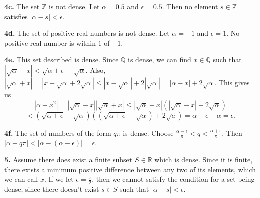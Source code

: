 \documentclass{article}
\begin{document}
\textbf{4c.} The set $\mathbb{Z}$ is not dense. Let $\alpha = 0.5$ and $\epsilon = 0.5$. Then no element $s \in \mathbb{Z}$ satisfies $|\alpha - s| < \epsilon$.
\newline

\textbf{4d.} The set of positive real numbers is not dense. Let $\alpha = -1$ and $\epsilon = 1$. No positive real number is within $1$ of $-1$.
\newline

\textbf{4e.} This set described is dense. Since $\mathbb{Q}$ is dense, we can find $x \in \mathbb{Q}$ such that $|\sqrt{\alpha} - x| < \sqrt{\alpha + \epsilon} - \sqrt{\alpha}$. Also, $|\sqrt{\alpha} + x| = |x - \sqrt{\alpha} + 2\sqrt{\alpha}| \le |x - \sqrt{\alpha}| + 2|\sqrt{\alpha}| = |\alpha - x| + 2\sqrt{\alpha}$. This gives us $$|\alpha - x^2| = |\sqrt{\alpha} - x||\sqrt{\alpha} + x| \le |\sqrt{\alpha} - x|(|\sqrt{\alpha} - x| + 2\sqrt{\alpha})$$$$ < (\sqrt{\alpha + \epsilon} - \sqrt{\alpha})((\sqrt{\alpha + \epsilon} - \sqrt{\alpha}) + 2\sqrt{a}) = \alpha + \epsilon - \alpha = \epsilon.$$
\newline

\textbf{4f.} The set of numbers of the form $q\pi$ is dense. Choose $\frac{\alpha - \epsilon}{\pi} < q < \frac{\alpha + \epsilon}{\pi}$. Then $|\alpha - q\pi| < |\alpha - (\alpha - \epsilon)| = \epsilon$.
\newline

\textbf{5.} Assume there does exist a finite subset $S \in \mathbb{R}$ which is dense. Since it is finite, there exists a minimum positive difference between any two of its elements, which we can call $x$. If we let $\epsilon = \frac{x}{2}$, then we cannot satisfy the condition for a set being dense, since there doesn't exist $s \in S$ such that $|\alpha - s| < \epsilon$.
\newline
\end{document}

